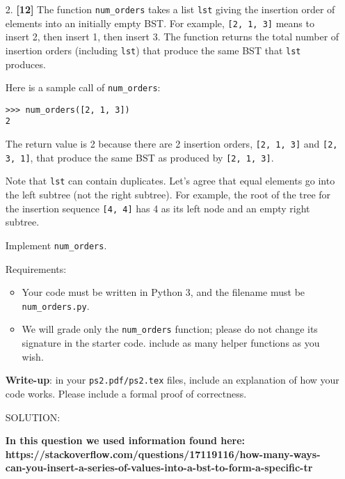\documentclass{assignment-263}
\begin{document}
\begin{enumerate}
\item[2.] \textbf{[12]} 
The function \verb|num_orders| takes a list \verb|lst| giving the insertion order of elements into an initially empty BST. For example, \verb|[2, 1, 3]| means to insert 2, then insert 1, then insert 3.
The function returns the total number of insertion orders (including \verb|lst|) that produce the same BST that \verb|lst| produces. 

Here is a sample call of \verb|num_orders|:
\begin{verbatim}
>>> num_orders([2, 1, 3])
2
\end{verbatim}
The return value is 2 because there are 2 insertion orders, \verb|[2, 1, 3]| and \verb|[2, 3, 1]|, that produce the same BST as produced by \verb|[2, 1, 3]|.

Note that \verb|lst| can contain duplicates. Let's agree that equal elements go into the left subtree (not the right subtree). For example, the root of the tree for the insertion sequence \verb|[4, 4]| has 4 as its left node and an empty right subtree.

Implement \verb|num_orders|.

Requirements:
\begin{itemize}
\item Your code must be written in Python 3, and the filename must be \verb|num_orders.py|.
\item We will grade only the \verb|num_orders| function; please do not change its signature in the starter code. include as many helper functions as you wish.
   \end{itemize}

\textbf{Write-up}: in your \verb|ps2.pdf/ps2.tex| files, include an explanation of how your code works. Please include a formal proof of correctness.

 
\vskip 19pt
SOLUTION:

\textbf{In this question we used information found here: https://stackoverflow.com/questions/17119116/how-many-ways-can-you-insert-a-series-of-values-into-a-bst-to-form-a-specific-tr}\\\\


\end{enumerate}
\end{document}

